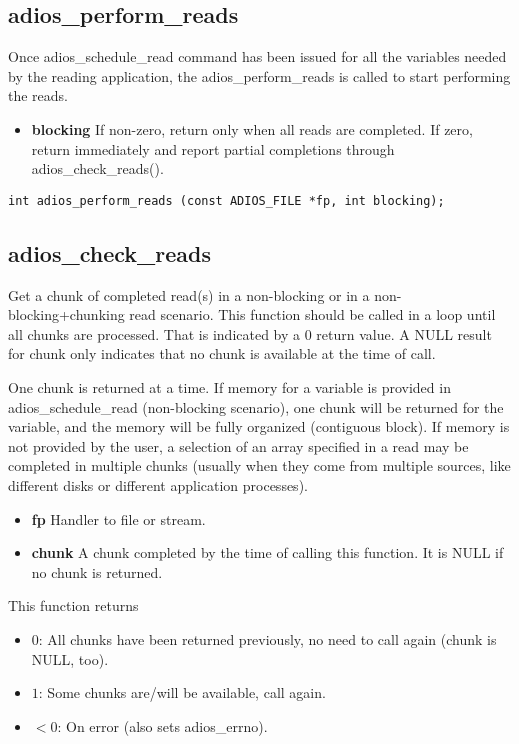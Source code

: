 \subsection{adios\_perform\_reads}
Once adios\_schedule\_read command has been issued for all the variables needed by the reading application, the adios\_perform\_reads 
is called to start performing the reads. 
\begin{itemize}
\item{\bf blocking} If non-zero, return only when all reads are completed.
If zero, return immediately and report partial completions
through adios\_check\_reads(). 
\end{itemize}

\begin{lstlisting}[alsolanguage=C]
int adios_perform_reads (const ADIOS_FILE *fp, int blocking);
\end{lstlisting}



\subsection{adios\_check\_reads}
Get a chunk of completed read(s) in a non-blocking or in a non-blocking+chunking read scenario.
This function should be called in a loop until all chunks are processed. 
That is indicated by a 0 return value. A NULL result for chunk only
indicates that no chunk is available at the time of call. 

One chunk is returned at a time. If memory for a variable is provided in adios\_schedule\_read 
(non-blocking scenario), one chunk will be returned for the variable, and the memory will be 
fully organized (contiguous block). If memory is not provided by the user,  a selection of an array 
specified in a read may be completed in multiple chunks (usually when they come from 
multiple sources, like different disks or different application processes). 

\begin{itemize}
\item{\bf fp} Handler to file or stream.
\item{\bf chunk} A chunk completed by the time of calling this function.
It is NULL if no chunk is returned.
\end{itemize}
This function returns 
\begin{itemize}
\item $0$: All chunks have been returned previously, 
                no need to call again (chunk is NULL, too).
\item $1$: Some chunks are/will be available, call again. 
\item $<0$: On error (also sets adios\_errno).
\end{itemize}

